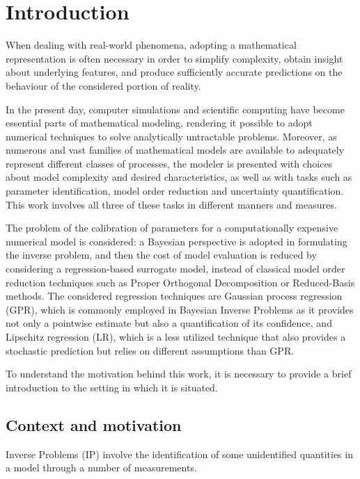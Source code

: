 \section{Introduction} \label{sec:intro}

When dealing with real-world phenomena, adopting a mathematical representation is often necessary in order to simplify complexity, obtain insight about underlying features, and produce sufficiently accurate predictions on the behaviour of the considered portion of reality. 

In the present day, computer simulations and scientific computing have become essential parts of mathematical modeling, rendering it possible to adopt numerical techniques to solve analytically untractable problems.
Moreover, as numerous and vast families of mathematical models are available to adequately represent different classes of processes, the modeler is presented with choices about model complexity and desired characteristics, as well as with tasks such as parameter identification, model order reduction and uncertainty quantification. 
This work involves all three of these tasks in different manners and measures. 

The problem of the calibration of parameters for a computationally expensive numerical model is considered: a Bayesian perspective is adopted in formulating the inverse problem, and then the cost of model evaluation is reduced by considering a regression-based surrogate model, instead of classical model order reduction techniques such as Proper Orthogonal Decomposition or Reduced-Basis methods.
The considered regression techniques are Gaussian process regression (GPR), which is commonly employed in Bayesian Inverse Problems as it provides not only a pointwise estimate but also a quantification of its confidence, and Lipschitz regression (LR), which is a less utilized technique that also provides a stochastic prediction but relies on different assumptions than GPR. 

To understand the motivation behind this work, it is necessary to provide a brief introduction to the setting in which it is situated.

\subsection{Context and motivation}\label{sec:context}

Inverse Problems (IP) involve the identification of some unidentified quantities in a model through a number of measurements.

